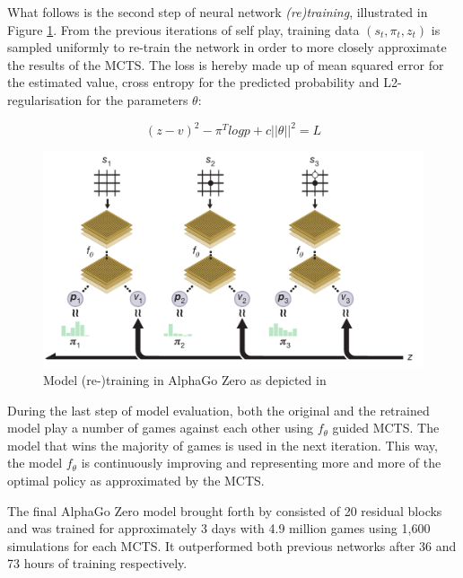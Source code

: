 \documentclass[12pt,a4paper]{article}
\begin{document}
What follows is the second step of neural network \emph{(re)training}, illustrated in Figure \ref{fig:retraining}. From the previous iterations of self play, training data $(s_t,\pi_t,z_t)$ is sampled uniformly to re-train the network in order to more closely approximate the results of the MCTS. The loss is hereby made up of mean squared error for the estimated value, cross entropy for the predicted probability and L2-regularisation for the parameters $\theta$:

$$(z-v)^2 - \pi^T log p + c ||\theta||^2= L$$

\begin{figure}
  \includegraphics[width=12cm]{img/training.png}
  \centering 
  \caption{Model (re-)training in AlphaGo Zero as depicted in \citet{silver_mastering_2017}}
  \label{fig:retraining}
\end{figure}

During the last step of model evaluation, both the original and the retrained model play a number of games against each other using $f_\theta$ guided MCTS. The model that wins the majority of games is used in the next iteration. This way, the model $f_\theta$ is continuously improving and representing more and more of the optimal policy as approximated by the MCTS.

The final AlphaGo Zero model brought forth by \citet{silver_mastering_2017} consisted of 20 residual blocks and was trained for approximately 3 days with 4.9 million games using 1,600 simulations for each MCTS. It outperformed both previous networks after 36 and 73 hours of training respectively. 
\end{document}
